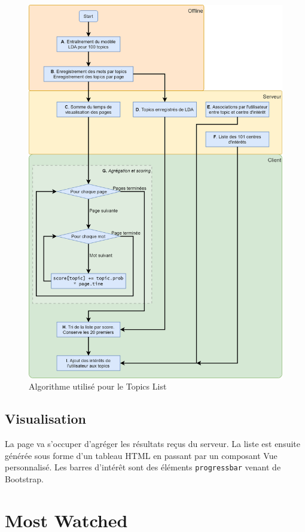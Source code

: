 		\begin{figure}[!h]
			\centering
			\includegraphics[height=1.35\textwidth]{images/design/pages/topics_algo}
			\caption{Algorithme utilisé pour le Topics List}
			\label{topics_algo}
		\end{figure}

	\subsection{Visualisation}

			La page va s'occuper d'agréger les résultats reçus du serveur. La liste est ensuite générée sous forme d'un tableau HTML en passant par un composant Vue personnalisé. Les barres d'intérêt sont des éléments \texttt{progressbar} venant de Bootstrap.

\clearpage

%
%
%
%

\section{Most Watched}

